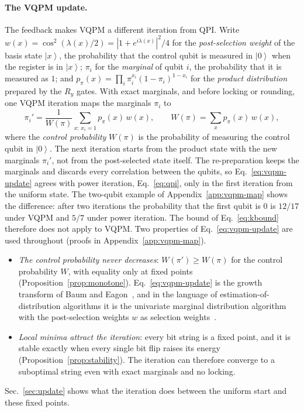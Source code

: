 \documentclass[onecolumn,10pt]{article}
\newcommand{\ket}[1]{\ensuremath{\left|#1\right\rangle}} %
\theoremstyle{remark}
\theoremstyle{plain}
\begin{document}
\paragraph{The VQPM update.} The feedback makes VQPM a different iteration from QPI. Write $w(x)=\cos^2(\lambda(x)/2)=|1+e^{i\lambda(x)}|^2/4$ for the \emph{post-selection weight} of the basis state $\ket{x}$, the probability that the control qubit is measured in $\ket{0}$ when the register is in $\ket{x}$; $\pi_i$ for the \emph{marginal} of qubit $i$, the probability that it is measured as $1$; and $p_\pi(x)=\prod_i\pi_i^{x_i}(1-\pi_i)^{1-x_i}$ for the \emph{product distribution} prepared by the $R_y$ gates. With exact marginals, and before locking or rounding, one VQPM iteration maps the marginals $\pi_i$ to
\begin{equation}
\label{eq:vqpm-update}
\pi_i'=\frac{1}{W(\pi)}\sum_{x:\,x_i=1}p_\pi(x)\,w(x),\qquad W(\pi)=\sum_xp_\pi(x)\,w(x),
\end{equation}
where the \emph{control probability} $W(\pi)$ is the probability of measuring the control qubit in $\ket{0}$. The next iteration starts from the product state with the new marginals $\pi_i'$, not from the post-selected state itself. The re-preparation keeps the marginals and discards every correlation between the qubits, so Eq.~\eqref{eq:vqpm-update} agrees with power iteration, Eq.~\eqref{eq:qpi}, only in the first iteration from the uniform state. The two-qubit example of Appendix~\ref{app:vqpm-map} shows the difference: after two iterations the probability that the first qubit is $0$ is $12/17$ under VQPM and $5/7$ under power iteration. The bound of Eq.~\eqref{eq:kbound} therefore does not apply to VQPM. Two properties of Eq.~\eqref{eq:vqpm-update} are used throughout (proofs in Appendix~\ref{app:vqpm-map}).
\begin{itemize}
\item[(i)] \emph{The control probability never decreases}: $W(\pi')\ge W(\pi)$ for the control probability $W$, with equality only at fixed points (Proposition~\ref{prop:monotone}). Eq.~\eqref{eq:vqpm-update} is the growth transform of Baum and Eagon~\cite{baum1967inequality}, and in the language of estimation-of-distribution algorithms it is the univariate marginal distribution algorithm with the post-selection weights $w$ as selection weights~\cite{muhlenbein1996recombination}.
\item[(ii)] \emph{Local minima attract the iteration}: every bit string is a fixed point, and it is stable exactly when every single bit flip raises its energy (Proposition~\ref{prop:stability}). The iteration can therefore converge to a suboptimal string even with exact marginals and no locking.
\end{itemize}
Sec.~\ref{sec:update} shows what the iteration does between the uniform start and these fixed points.
\end{document}
